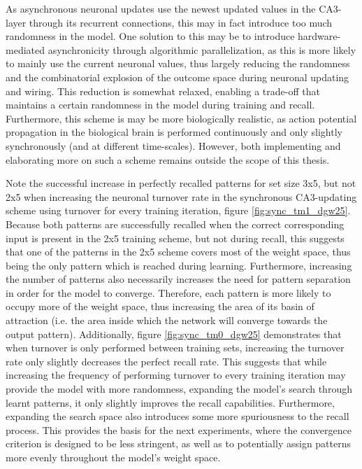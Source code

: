 As asynchronous neuronal updates use the newest updated values in the CA3-layer through its recurrent connections, this may in fact introduce too much randomness in the model. One solution to this may be to introduce hardware-mediated asynchronicity through algorithmic parallelization, as this is more likely to mainly use the current neuronal values, thus largely reducing the randomness and the combinatorial explosion of the outcome space during neuronal updating and wiring. This reduction is somewhat relaxed, enabling a trade-off that maintains a certain randomness in the model during training and recall. Furthermore, this scheme is may be more biologically realistic, as action potential propagation in the biological brain is performed continuously and only slightly synchronously (and at different time-scales). However, both implementing and elaborating more on such a scheme remains outside the scope of this thesis.

Note the successful increase in perfectly recalled patterns for set size 3x5, but not 2x5 when increasing the neuronal turnover rate in the synchronous CA3-updating scheme using turnover for every training iteration, figure \ref{fig:sync_tm1_dgw25}. Because both patterns are successfully recalled when the correct corresponding input is present in the 2x5 training scheme, but not during recall, this suggests that one of the patterns in the 2x5 scheme covers most of the weight space, thus being the only pattern which is reached during learning. Furthermore, increasing the number of patterns also necessarily increases the need for pattern separation in order for the model to converge. Therefore, each pattern is more likely to occupy more of the weight space, thus increasing the area of its basin of attraction (i.e. the area inside which the network will converge towards the output pattern). Additionally, figure \ref{fig:sync_tm0_dgw25} demonstrates that when turnover is only performed between training sets, increasing the turnover rate only slightly decreases the perfect recall rate. This suggests that while increasing the frequency of performing turnover to every training iteration may provide the model with more randomness, expanding the model's search through learnt patterns, it only slightly improves the recall capabilities. Furthermore, expanding the search space also introduces some more spuriousness to the recall process. This provides the basis for the next experiments, where the convergence criterion is designed to be less stringent, as well as to potentially assign patterns more evenly throughout the model's weight space.

